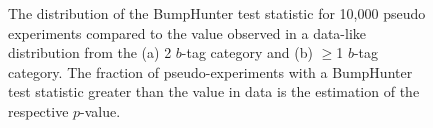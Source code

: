 \begin{figure}[!ht]
  \begin{center}
    \captionsetup[subfigure]{aboveskip=0pt,justification=centering}
  \end{center}
  \caption{The distribution of the BumpHunter test statistic for 10,000 pseudo experiments compared
    to the value observed in a data-like distribution from the (a) 2 $b$-tag category and (b) $\geq$1 $b$-tag category.
    The fraction of pseudo-experiments with a BumpHunter test statistic greater than the value in data is the estimation of the respective $p$-value.}
  \label{fig:DataLikeStatPlots_bh}
\end{figure}


